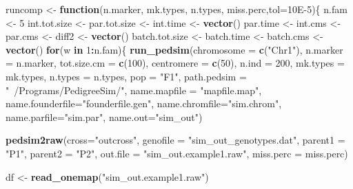 \documentclass[]{article}
\newenvironment{Shaded}{\begin{snugshade}}{\end{snugshade}}
\newcommand{\ControlFlowTok}[1]{\textcolor[rgb]{0.13,0.29,0.53}{\textbf{#1}}}
\newcommand{\DataTypeTok}[1]{\textcolor[rgb]{0.13,0.29,0.53}{#1}}
\newcommand{\DecValTok}[1]{\textcolor[rgb]{0.00,0.00,0.81}{#1}}
\newcommand{\FloatTok}[1]{\textcolor[rgb]{0.00,0.00,0.81}{#1}}
\newcommand{\KeywordTok}[1]{\textcolor[rgb]{0.13,0.29,0.53}{\textbf{#1}}}
\newcommand{\NormalTok}[1]{#1}
\newcommand{\OperatorTok}[1]{\textcolor[rgb]{0.81,0.36,0.00}{\textbf{#1}}}
\newcommand{\StringTok}[1]{\textcolor[rgb]{0.31,0.60,0.02}{#1}}
\begin{document}
\begin{Shaded}
\begin{Highlighting}[]
\NormalTok{runcomp <-}\StringTok{ }\ControlFlowTok{function}\NormalTok{(n.marker, mk.types, n.types, miss.perc,}\DataTypeTok{tol=}\FloatTok{10E-5}\NormalTok{)\{}
\NormalTok{  n.fam <-}\StringTok{ }\DecValTok{5}
\NormalTok{  int.tot.size <-}\StringTok{ }\NormalTok{par.tot.size <-}\StringTok{ }\NormalTok{int.time <-}\StringTok{ }\KeywordTok{vector}\NormalTok{()}
\NormalTok{  par.time <-}\StringTok{ }\NormalTok{int.cms <-}\StringTok{ }\NormalTok{par.cms <-}\StringTok{  }\NormalTok{diff2 <-}\StringTok{ }\KeywordTok{vector}\NormalTok{()}
\NormalTok{  batch.tot.size  <-}\StringTok{ }\NormalTok{batch.time <-}\StringTok{ }\NormalTok{batch.cms <-}\StringTok{ }\KeywordTok{vector}\NormalTok{() }
  \ControlFlowTok{for}\NormalTok{(w }\ControlFlowTok{in} \DecValTok{1}\OperatorTok{:}\NormalTok{n.fam)\{}
    \KeywordTok{run_pedsim}\NormalTok{(}\DataTypeTok{chromosome =} \KeywordTok{c}\NormalTok{(}\StringTok{"Chr1"}\NormalTok{), }\DataTypeTok{n.marker =}\NormalTok{ n.marker, }
               \DataTypeTok{tot.size.cm =} \KeywordTok{c}\NormalTok{(}\DecValTok{100}\NormalTok{), }\DataTypeTok{centromere =} \KeywordTok{c}\NormalTok{(}\DecValTok{50}\NormalTok{),}
               \DataTypeTok{n.ind =} \DecValTok{200}\NormalTok{, }\DataTypeTok{mk.types =}\NormalTok{ mk.types,}
               \DataTypeTok{n.types =}\NormalTok{ n.types, }\DataTypeTok{pop =} \StringTok{"F1"}\NormalTok{, }\DataTypeTok{path.pedsim =} \StringTok{"~/Programs/PedigreeSim/"}\NormalTok{,}
               \DataTypeTok{name.mapfile =} \StringTok{"mapfile.map"}\NormalTok{, }\DataTypeTok{name.founderfile=}\StringTok{"founderfile.gen"}\NormalTok{,}
               \DataTypeTok{name.chromfile=}\StringTok{"sim.chrom"}\NormalTok{, }\DataTypeTok{name.parfile=}\StringTok{"sim.par"}\NormalTok{,}
               \DataTypeTok{name.out=}\StringTok{"sim_out"}\NormalTok{)}
    
    \KeywordTok{pedsim2raw}\NormalTok{(}\DataTypeTok{cross=}\StringTok{"outcross"}\NormalTok{, }\DataTypeTok{genofile =} \StringTok{"sim_out_genotypes.dat"}\NormalTok{, }
               \DataTypeTok{parent1 =} \StringTok{"P1"}\NormalTok{, }\DataTypeTok{parent2 =} \StringTok{"P2"}\NormalTok{, }
               \DataTypeTok{out.file =} \StringTok{"sim_out.example1.raw"}\NormalTok{, }\DataTypeTok{miss.perc =}\NormalTok{ miss.perc)}
    
\NormalTok{    df <-}\StringTok{ }\KeywordTok{read_onemap}\NormalTok{(}\StringTok{"sim_out.example1.raw"}\NormalTok{)}
    

\end{Highlighting}
\end{Shaded}
\end{document}
